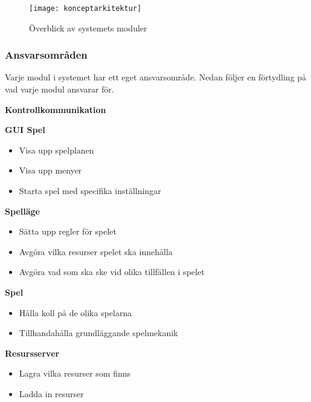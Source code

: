 \begin{figure}[h]
    \centering
    \texttt{[image: konceptarkitektur]}
    \caption{Överblick av systemets moduler}
    \label{fig:konceptarkitektur}
\end{figure}

\pagebreak


\subsubsection*{Ansvarsområden}
Varje modul i systemet har ett eget ansvarsområde. Nedan följer en förtydling på vad varje modul ansvarar för.

\begin{labeling}{\small{\textbf{Kontrollkommunikation}}}
    \item [\small{\textbf{GUI Spel}}]
        \begin{itemize}
            \item Visa upp spelplanen
            \item Visa upp menyer
            \item Starta spel med specifika inställningar
            \newline
        \end{itemize}

    \item [\small{\textbf{Spelläge}}]
        \begin{itemize}
            \item Sätta upp regler för spelet
            \item Avgöra vilka resurser spelet ska innehålla
            \item Avgöra vad som ska ske vid olika tillfällen i spelet
            \newline
        \end{itemize}

    \item [\small{\textbf{Spel}}]
        \begin{itemize}
            \item Hålla koll på de olika spelarna
            \item Tillhandahålla grundläggande spelmekanik
            \newline
        \end{itemize}

    \item [\small{\textbf{Resursserver}}]
        \begin{itemize}
            \item Lagra vilka resurser som finns
            \item Ladda in resurser
            \newline
        \end{itemize}


\end{labeling}

